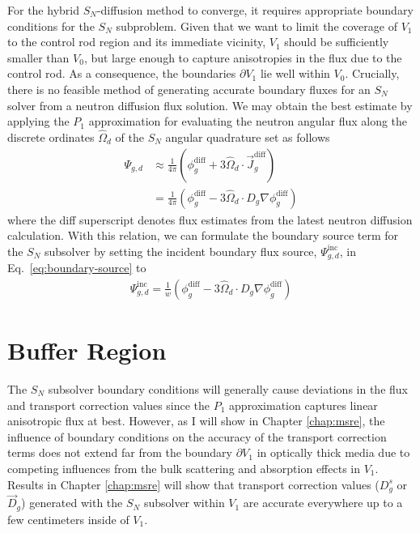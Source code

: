 For the hybrid $S_N$-diffusion method to converge, it requires appropriate boundary conditions for
the $S_N$ subproblem.
Given that we want to limit the coverage of $V_1$ to the control rod region and its
immediate vicinity, $V_1$ should be sufficiently smaller than $V_0$, but large enough to capture
anisotropies in the flux due to the control rod. As a consequence, the boundaries $\partial V_1$ 
lie well within $V_0$. Crucially, there is no feasible method of generating
accurate boundary fluxes for an $S_N$ solver from a neutron diffusion flux solution. We may obtain
the best estimate by applying the $P_1$ approximation for evaluating the neutron angular flux along
the discrete ordinates $\hat{\Omega}_d$ of the $S_N$ angular quadrature set as follows
%
\begin{align}
  \Psi_{g,d} &\approx \frac{1}{4\pi}\left(\phi^\text{diff}_g+3\hat{\Omega}_d\cdot
  \vec{J}^\text{diff}_g\right) \nonumber \\
  &=\frac{1}{4\pi}\left(\phi^\text{diff}_g-3\hat{\Omega}_d\cdot D_g\nabla\phi^\text{diff}_g\right)
\end{align}
%
where the diff superscript denotes flux estimates from the latest neutron diffusion calculation.
With this relation, we can formulate the boundary source term for the $S_N$ subsolver by setting
the incident boundary flux source,
$\Psi^\text{inc}_{g,d}$, in Eq.\ \ref{eq:boundary-source} to
%
\begin{gather}
  \Psi^\text{inc}_{g,d} = \frac{1}{w}
  \left(\phi^\text{diff}_g-3\hat{\Omega}_d\cdot D_g\nabla\phi^\text{diff}_g\right)
\end{gather}

\section{Buffer Region} \label{sec:buffer-region}

The $S_N$ subsolver boundary conditions will generally cause deviations
in the flux and transport correction values since the $P_1$ approximation captures
linear anisotropic flux at best. However, as I will show in Chapter \ref{chap:msre},
the influence of boundary conditions on the accuracy of
the transport correction terms does not extend far from the boundary $\partial V_1$ in optically
thick media due to competing influences from the bulk scattering and absorption effects in $V_1$.
Results in Chapter \ref{chap:msre} will show that transport correction values
($D^s_g$ or $\vec{D}_g$) generated with the $S_N$ subsolver within $V_1$ are accurate everywhere up
to a few centimeters inside of $V_1$.

